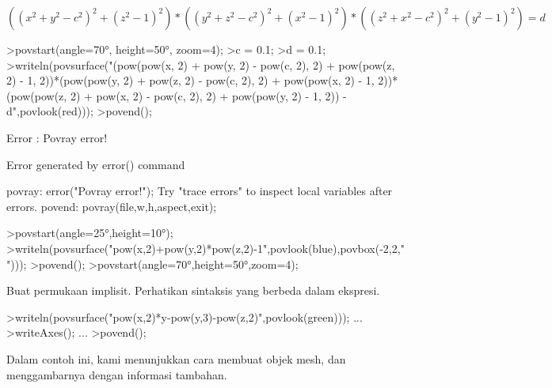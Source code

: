 \documentclass[a4paper,10pt]{article}
\begin{document}
\begin{eulernotebook}
\begin{eulercomment}
\begin{eulercomment}
\begin{eulercomment}
\begin{eulercomment}
\begin{eulercomment}
\begin{eulercomment}
\begin{eulercomment}
\begin{eulercomment}
\begin{eulercomment}
\begin{eulercomment}
\begin{eulercomment}
\begin{eulercomment}
\begin{eulercomment}
\begin{eulercomment}
\begin{eulercomment}
\begin{eulercomment}
\begin{eulercomment}
\end{eulercomment}
\begin{eulerformula}
\[
((x^2+y^2-c^2)^2+(z^2-1)^2)*((y^2+z^2-c^2)^2+(x^2-1)^2)*((z^2+x^2-c^2)^2+(y^2-1)^2)=d
\]
\end{eulerformula}
\begin{eulerprompt}
>povstart(angle=70°, height=50°, zoom=4);
>c = 0.1;
>d = 0.1;
>writeln(povsurface("(pow(pow(x, 2) + pow(y, 2) - pow(c, 2), 2) + pow(pow(z, 2) - 1, 2))*(pow(pow(y, 2) + pow(z, 2) - pow(c, 2), 2) + pow(pow(x, 2) - 1, 2))*(pow(pow(z, 2) + pow(x, 2) - pow(c, 2), 2) + pow(pow(y, 2) - 1, 2)) - d",povlook(red)));
>povend();
\end{eulerprompt}
\begin{euleroutput}
  Error : Povray error!
  
  Error generated by error() command
  
  povray:
      error("Povray error!");
  Try "trace errors" to inspect local variables after errors.
  povend:
      povray(file,w,h,aspect,exit); 
\end{euleroutput}
\begin{eulerprompt}
>povstart(angle=25°,height=10°); 
>writeln(povsurface("pow(x,2)+pow(y,2)*pow(z,2)-1",povlook(blue),povbox(-2,2,"")));
>povend();
>povstart(angle=70°,height=50°,zoom=4);
\end{eulerprompt}
\begin{eulercomment}
Buat permukaan implisit. Perhatikan sintaksis yang berbeda dalam
ekspresi.
\end{eulercomment}
\begin{eulerprompt}
>writeln(povsurface("pow(x,2)*y-pow(y,3)-pow(z,2)",povlook(green))); ...
>writeAxes(); ...
>povend();
\end{eulerprompt}
\begin{eulercomment}
Dalam contoh ini, kami menunjukkan cara membuat objek mesh, dan
menggambarnya dengan informasi tambahan.


\end{eulercomment}
\end{eulercomment}
\end{eulercomment}
\end{eulercomment}
\end{eulercomment}
\end{eulercomment}
\end{eulercomment}
\end{eulercomment}
\end{eulercomment}
\end{eulercomment}
\end{eulercomment}
\end{eulercomment}
\end{eulercomment}
\end{eulercomment}
\end{eulercomment}
\end{eulercomment}
\end{eulercomment}
\end{eulernotebook}
\end{document}
